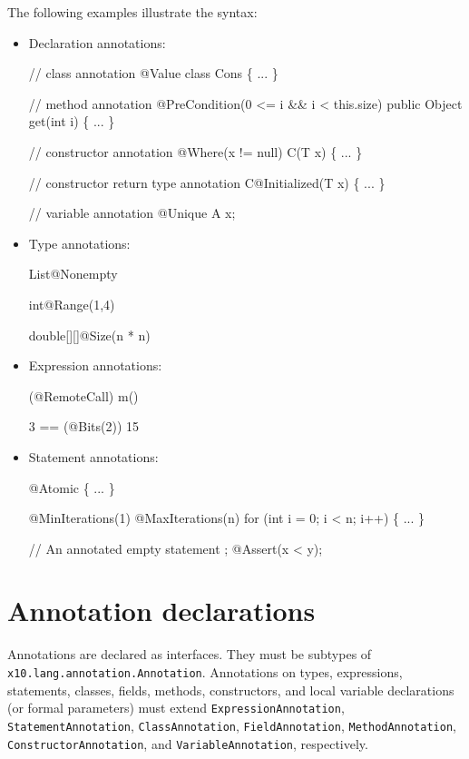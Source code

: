 \noindent
The following examples illustrate the syntax:

\begin{itemize}
\item Declaration annotations:
\begin{x10}
  // class annotation
  @Value
  class Cons \{ ... \}

  // method annotation
  @PreCondition(0 <= i \&\& i < this.size)
  public Object get(int i) \{ ... \}

  // constructor annotation
  @Where(x != null)
  C(T x) \{ ... \}

  // constructor return type annotation
  C@Initialized(T x) \{ ... \}

  // variable annotation
  @Unique A x;
\end{x10}
\item Type annotations:
\begin{x10}
  List@Nonempty

  int@Range(1,4)

  double[][]@Size(n * n)
\end{x10}
\item Expression annotations:
\begin{x10}
  (@RemoteCall) m()

  3 == (@Bits(2)) 15
\end{x10}
\item Statement annotations:
\begin{x10}
  @Atomic \{ ... \}

  @MinIterations(1)
  @MaxIterations(n)
  for (int i = 0; i < n; i++) \{ ... \}

  // An annotated empty statement ;
  @Assert(x < y);
\end{x10}
\end{itemize}

\section{Annotation declarations}

Annotations are declared as interfaces.  They must be
subtypes of \texttt{x10.lang.annotation.Annotation}.
Annotations on types, expressions, statements, classes, fields,
methods, constructors, and local variable declarations (or
formal parameters)
must extend
\texttt{ExpressionAnnotation},
\texttt{StatementAnnotation},
\texttt{ClassAnnotation},
\texttt{FieldAnnotation},
\texttt{MethodAnnotation},
\texttt{ConstructorAnnotation}, and
\texttt{VariableAnnotation}, respectively.

